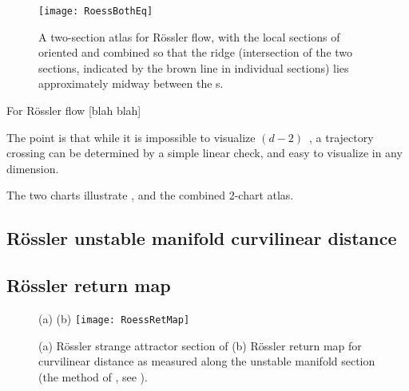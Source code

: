 \begin{figure}%
\begin{center}
  \texttt{[image: RoessBothEq]}
\end{center}
  \caption{
  A two-section atlas for R\"ossler flow, with the local sections of
   oriented and combined so that
  the ridge (intersection of the two sections, indicated by the brown
  line in individual sections) lies  approximately midway between the
  \template s.
  } \label{fig:RoessBothEq}
\end{figure}

    \ifdraft\color{blue}

For R\"ossler flow 
[blah blah]

The point is that while it is impossible to visualize  $(d\!-\!2)$\dmn\
{\poincBord}, a trajectory crossing can be determined by a simple linear
check, and easy to visualize in any dimension.


The two charts
 illustrate \poincBord,
and \reffigs{fig:RoessBothEq} the combined 2-chart atlas.

\subsection{R\"ossler unstable manifold curvilinear distance}
\subsection{R\"ossler return map}

\begin{figure}
\begin{center}
(a) %
(b) \texttt{[image: RoessRetMap]}
\end{center}
  \caption{
(a) R\"ossler strange attractor section of 
(b) R\"ossler return map for curvilinear distance as measured
along the unstable manifold section (the method of
, see ).
  }
\label{fig:RoessRetMap}
\end{figure}

